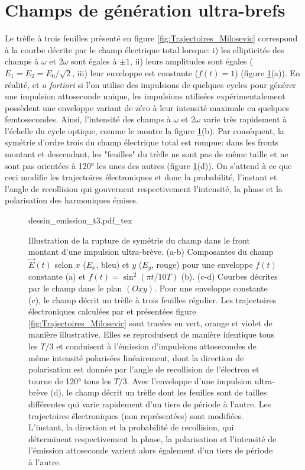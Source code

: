 \section{Champs de génération ultra-brefs}
\label{sec:ChampsBrefs}
Le trèfle à trois feuilles présenté en figure \ref{fig:Trajectoires_Milosevic} correspond à la courbe décrite par le champ électrique total lorsque: i) les ellipticités des champs à $\omega$ et $2 \omega$ sont égales à $\pm 1$, ii) leurs amplitudes sont égales ($E_1 = E_2 = E_0/\sqrt{2}$, iii) leur enveloppe est constante ($f(t) = 1$) (figure \ref{fig:dessin_emission_t3}(a)). En réalité, et \textit{a fortiori} si l'on utilise des impulsions de quelques cycles pour générer une impulsion attoseconde unique, les impulsions utilisées expérimentalement possèdent une enveloppe variant de zéro à leur intensité maximale en quelques femtosecondes. Ainsi, l'intensité des champs à $\omega$ et 2$\omega$ varie très rapidement à l'échelle du cycle optique, comme le montre la figure \ref{fig:dessin_emission_t3}(b). Par conséquent, la symétrie d'ordre trois du champ électrique total est rompue: dans les fronts montant et descendant, les "feuilles" du trèfle ne sont pas de même taille et ne sont pas orientées à 120° les unes des autres (figure \ref{fig:dessin_emission_t3}(d)). On s'attend à ce que ceci modifie les trajectoires électroniques et donc la probabilité, l'instant et l'angle de recollision qui gouvernent respectivement l'intensité, la phase et la polarisation des harmoniques émises.

\begin{figure}
\centering
\def\svgwidth{\textwidth}
{dessin_emission_t3.pdf_tex}
\caption{Illustration de la rupture de symétrie du champ dans le front montant d'une impulsion ultra-brève. (a-b) Composantes du champ $\vec{E}(t)$ selon $x$ ($E_x$, bleu) et $y$ ($E_y$, rouge) pour une enveloppe  $f(t)$ constante (a) et $f(t) = \sin^2 (\pi t / 10 T)$ (b). (c-d) Courbes décrites par le champ dans le plan $(Oxy)$. Pour une enveloppe constante (c), le champ décrit un trèfle à trois feuilles régulier. Les trajectoires électroniques calculées par  et présentées figure \ref{fig:Trajectoires_Milosevic} sont tracées en vert, orange et violet de manière illustrative. Elles se reproduisent de manière identique tous les $T/3$ et conduisent à l'émission d'impulsions attosecondes de même intensité polarisées linéairement, dont la direction de polarisation est donnée par l'angle de recollision de l'électron et tourne de 120° tous les $T/3$. Avec l'enveloppe d'une impulsion ultra-brève (d), le champ décrit un trèfle dont les feuilles sont de tailles différentes qui varie rapidement d'un tiers de période à l'autre. Les trajectoires électroniques (non représentées) sont modifiées. L'instant, la direction et la probabilité de recollision, qui déterminent respectivement la phase, la polarisation et l'intensité de l'émission attoseconde varient alors également d'un tiers de période à l'autre.}
\label{fig:dessin_emission_t3}
\end{figure}

